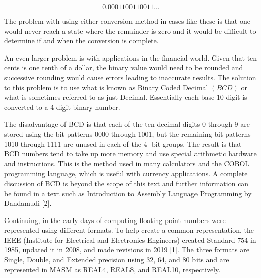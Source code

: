 \documentclass[10pt]{book}
\begin{document}
\begin{center}
\begin{center}
\begin{center}
\begin{center}
\begin{center}
$$
0.0001100110011 \ldots
$$

The problem with using either conversion method in cases like these is that one would never reach a state where the remainder is zero and it would be difficult to determine if and when the conversion is complete.

An even larger problem is with applications in the financial world. Given that ten cents is one tenth of a dollar, the binary value would need to be rounded and successive rounding would cause errors leading to inaccurate results. The solution to this problem is to use what is known as Binary Coded Decimal $(B C D)$ or what is sometimes referred to as just Decimal. Essentially each base-10 digit is converted to a 4-digit binary number.

The disadvantage of BCD is that each of the ten decimal digits 0 through 9 are stored using the bit patterns 0000 through 1001, but the remaining bit patterns 1010 through 1111 are unused in each of the 4 -bit groups. The result is that BCD numbers tend to take up more memory and use special arithmetic hardware and instructions. This is the method used in many calculators and the COBOL programming language, which is useful with currency applications. A complete discussion of BCD is beyond the scope of this text and further information can be found in a text such as Introduction to Assembly Language Programming by Dandamudi [2].

Continuing, in the early days of computing floating-point numbers were represented using different formats. To help create a common representation, the IEEE (Institute for Electrical and Electronics Engineers) created Standard 754 in 1985, updated it in 2008, and made revisions in 2019 [1]. The three formats are Single, Double, and Extended precision using 32, 64, and 80 bits and are represented in MASM as REAL4, REAL8, and REAL10, respectively.


\end{center}
\end{center}
\end{center}
\end{center}
\end{center}
\end{document}
